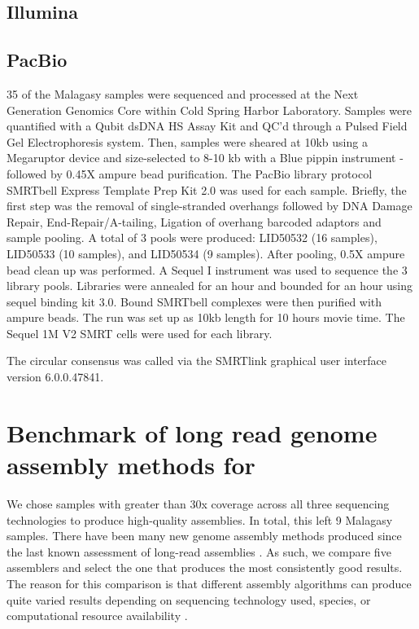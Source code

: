 \subsection{Illumina}


\subsection{\ont{}}


\subsection{PacBio}
\label{app:pacbio-seq}

35 of the Malagasy samples were sequenced and processed at the Next Generation Genomics Core within Cold Spring Harbor Laboratory. Samples were quantified with a Qubit dsDNA HS Assay Kit and QC’d through a Pulsed Field Gel Electrophoresis system. Then, samples were sheared at 10kb using a Megaruptor device and size-selected to 8-10 kb with a Blue pippin instrument - followed by 0.45X ampure bead purification. The PacBio library protocol SMRTbell Express Template Prep Kit 2.0 was used for each sample. Briefly, the first step was the removal of single-stranded overhangs followed by DNA Damage Repair, End-Repair/A-tailing, Ligation of overhang barcoded adaptors and sample pooling. A total of 3 pools were produced: LID50532 (16 samples), LID50533 (10 samples), and LID50534 (9 samples). After pooling, 0.5X ampure bead clean up was performed. A Sequel I instrument was used to sequence the 3 library pools. Libraries were annealed for an hour and bounded for an hour using sequel binding kit 3.0. Bound SMRTbell complexes were then purified with ampure beads. The run was set up as 10kb length for 10 hours movie time. The Sequel 1M V2 SMRT cells were used for each library.  

The circular consensus was called via the SMRTlink graphical user interface version 6.0.0.47841.


\section{Benchmark of long read genome assembly methods for \mtb{}}
\label{app:asm}
We chose samples with greater than 30x coverage across all three sequencing technologies to produce high-quality assemblies. In total, this left 9 Malagasy samples. There have been many new genome assembly methods produced since the last known assessment of \mtb{} long-read assemblies \cite{bainomugisa2018}. As such, we compare five assemblers and select the one that produces the most consistently good results. The reason for this comparison is that different assembly algorithms can produce quite varied results depending on sequencing technology used, species, or computational resource availability \cite{demaio2019,wick2020}.  

